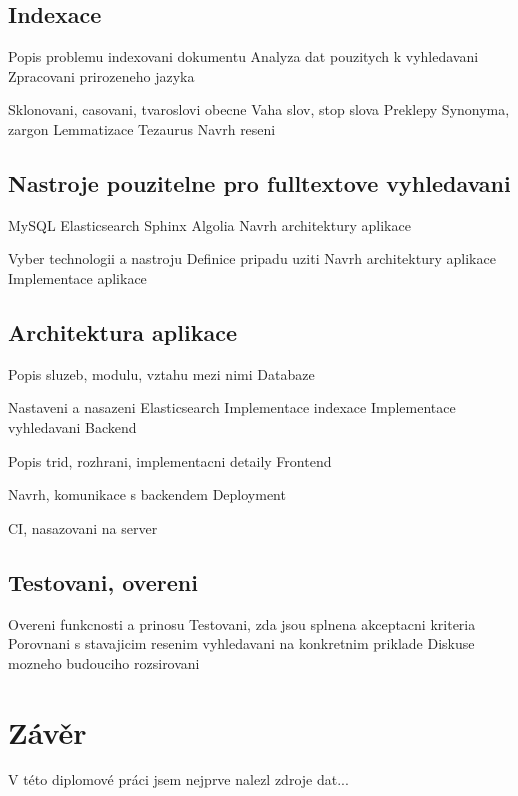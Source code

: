 \documentclass[FM,DP]{tulthesis}
\begin{document}
\section{Indexace}

Popis problemu indexovani dokumentu
Analyza dat pouzitych k vyhledavani
Zpracovani prirozeneho jazyka

Sklonovani, casovani, tvaroslovi obecne
Vaha slov, stop slova
Preklepy
Synonyma, zargon
Lemmatizace
Tezaurus
Navrh reseni

\section{Nastroje pouzitelne pro fulltextove vyhledavani}

MySQL
Elasticsearch
Sphinx
Algolia
Navrh architektury aplikace

Vyber technologii a nastroju
Definice pripadu uziti
Navrh architektury aplikace
Implementace aplikace

\section{Architektura aplikace}

Popis sluzeb, modulu, vztahu mezi nimi
Databaze

Nastaveni a nasazeni Elasticsearch
Implementace indexace
Implementace vyhledavani
Backend

Popis trid, rozhrani, implementacni detaily
Frontend

Navrh, komunikace s backendem
Deployment

CI, nasazovani na server

\section{Testovani, overeni}

Overeni funkcnosti a prinosu
Testovani, zda jsou splnena akceptacni kriteria
Porovnani s stavajicim resenim vyhledavani na konkretnim priklade
Diskuse mozneho budouciho rozsirovani




\chapter{Závěr}

V této diplomové práci jsem nejprve nalezl zdroje dat...
\end{document}
